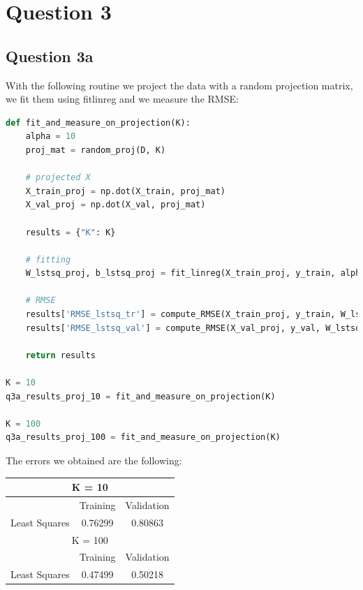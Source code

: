 \documentclass{article}
\begin{document}
\section*{Question 3}

\subsection*{Question 3a}

With the following routine we project the data with a random projection matrix, we fit them using fitlinreg and we measure the RMSE:

\begin{lstlisting}[language=Python]
def fit_and_measure_on_projection(K):
    alpha = 10
    proj_mat = random_proj(D, K)

    # projected X
    X_train_proj = np.dot(X_train, proj_mat)
    X_val_proj = np.dot(X_val, proj_mat)

    results = {"K": K}

    # fitting
    W_lstsq_proj, b_lstsq_proj = fit_linreg(X_train_proj, y_train, alpha)

    # RMSE
    results['RMSE_lstsq_tr'] = compute_RMSE(X_train_proj, y_train, W_lstsq_proj, b_lstsq_proj)
    results['RMSE_lstsq_val'] = compute_RMSE(X_val_proj, y_val, W_lstsq_proj, b_lstsq_proj)
    
    return results

K = 10
q3a_results_proj_10 = fit_and_measure_on_projection(K)

K = 100
q3a_results_proj_100 = fit_and_measure_on_projection(K)
\end{lstlisting}


The errors we obtained are the following:
\begin{center}
\begin{tabular}{ | c | c | c | }
\hline
\multicolumn{3}{|c|}{ K = 10 } \\
\hline
 & Training & Validation \\
\hline
Least Squares & 0.76299 & 0.80863\\ 
\hline

\hline 
\hline

\multicolumn{3}{|c|}{ K = 100 } \\
\hline
 & Training & Validation \\
\hline
Least Squares & 0.47499 & 0.50218 \\ 
\hline
\end{tabular}
\end{center}
\end{document}
